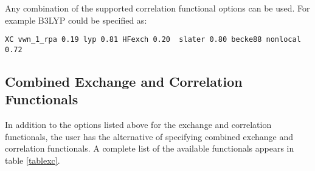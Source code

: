 %
%
%

%

\fussy

Any combination of the supported correlation functional options can be
used.  For example  B3LYP could be specified as:
\begin{verbatim}
XC vwn_1_rpa 0.19 lyp 0.81 HFexch 0.20  slater 0.80 becke88 nonlocal 0.72
\end{verbatim}

  
\subsection{Combined Exchange and Correlation Functionals}

In addition to the options listed above for the exchange and correlation
functionals, the user has the alternative of specifying combined exchange and 
correlation functionals. A complete list of the available functionals
appears in table \ref{tablexc}.

